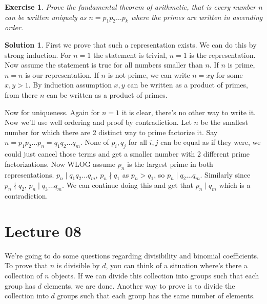 \documentclass[a4paper,10pt]{article}
\newtheorem{exercise}{Exercise}[section]
\theoremstyle{definition} %
\newtheorem*{solution}{Solution}
\begin{document}
        \newpage
        \begin{exercise}
            Prove the fundamental theorem of arithmetic, that is every number $n$ can 
            be written uniquely as $n = p_1p_2 \dots p_k$ where the primes are written 
            in ascending order.
        \end{exercise}
        \begin{solution}
            First we prove that such a representation exists. We can do this by strong 
            induction. For $n=1$ the statement is trivial, $n=1$ is the representation.
            Now assume the statement is true for all numbers smaller than $n$. If $n$ is
            prime, $n = n$ is our representation. If $n$ is not prime, we can write 
            $n = xy$ for some $x,y > 1$. By induction assumption $x,y$ can be written as
            a product of primes, from there $n$ can be written as a product of primes.

            Now for uniqueness. Again for $n=1$ it is clear, there's no other way to write
            it. Now we'll use well ordering and proof by contradiction. Let $n$ be the 
            smallest number for which there are 2 distinct way to prime factorize it.
            Say $n = p_1p_2 \dots p_n = q_1q_2 \dots q_m$. None of $p_i, q_j$ for all $i, j$
            can be equal as if they were, we could just cancel those terms and get a smaller
            number with 2 different prime factorizations. Now WLOG assume $p_n$ is the largest
            prime in both representations. $p_n \mid q_1q_2 \dots q_m$, $p_n \nmid q_1$ as
            $p_n > q_1$, so $p_n \mid q_2 \dots q_m$. Similarly since $p_n \nmid q_2$, 
            $p_n \mid q_3 \dots q_m$. We can continue doing this and get that $p_n \mid q_m$
            which is a contradiction.
        \end{solution}

    \section{Lecture 08}

    We're going to do some questions regarding divisibility and binomial coefficients.
    To prove that $n$ is divisible by $d$, you can think of a situation where's there
    a collection of $n$ objects. If we can divide this collection into groups such that 
    each group has $d$ elements, we are done. Another way to prove is to divide the 
    collection into $d$ groups such that each group has the same number of elements.
\end{document}
